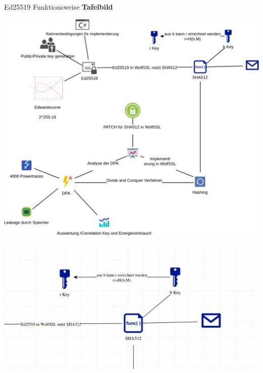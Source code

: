 \documentclass[
  10pt,
  ignorenonframetext,
  aspectratio=43,
]{beamer}
\begin{document}
\begin{frame}{Ed25519 Funktionsweise}
\protect\hypertarget{ed25519-funktionsweise}{}
\textbf{Tafelbild}
\end{frame}

\begin{frame}{}
\protect\hypertarget{section-2}{}
\includegraphics{Abbildungen/ITSEC(1)_res.png}
\end{frame}

\begin{frame}{}
\protect\hypertarget{section-3}{}
\includegraphics{Abbildungen/Punkt2.png}
\end{frame}
\end{document}
